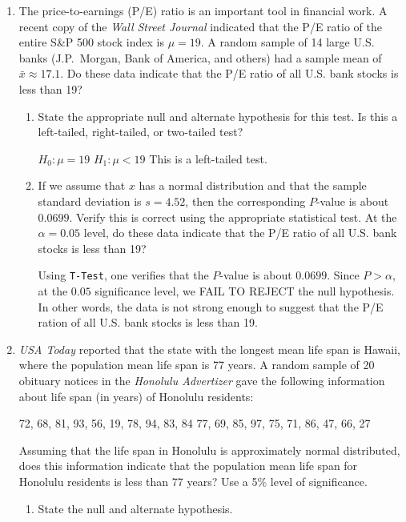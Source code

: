 \documentclass{article}
\newcommand{\answer}[1]{\color{white}#1}
\begin{document}
\begin{enumerate}
\begin{enumerate}
	\end{enumerate}

\vfill

\item The price-to-earnings (P/E) ratio is an important tool in financial work. A recent copy of the {\em Wall Street Journal} indicated that the P/E ratio of the entire S\&P 500 stock index is $\mu = 19$. A random sample of 14 large U.S. banks (J.P.\ Morgan, Bank of America, and others) had a sample mean of $\bar{x} \approx 17.1$. Do these data indicate that the P/E ratio of all U.S. bank stocks is less than 19?
	\begin{enumerate}
	\item State the appropriate null and alternate hypothesis for this test. Is this a left-tailed, right-tailed, or two-tailed test? 
	
	{\answer $H_0: \mu = 19$ 
	$H_1: \mu <19$ 
	This is a left-tailed test.} 
	
	\item If we assume that $x$ has a normal distribution and that the sample standard deviation is $s = 4.52$, then the corresponding $P$-value is about $0.0699$. Verify this is correct using the appropriate statistical test. At the $\alpha = 0.05$ level, do these data indicate that the P/E ratio of all U.S. bank stocks is less than 19? 
	
	{\answer Using \texttt{T-Test}, one verifies that the $P$-value is about $0.0699$. Since $P>\alpha$, at the $0.05$ significance level, we FAIL TO REJECT the null hypothesis. In other words, the data is not strong enough to suggest that the P/E ration of all U.S. bank stocks is less than 19.} 
	\vspace{1cm}
	
	\end{enumerate}

\vfill

\newpage

\item {\em USA Today} reported that the state with the longest mean life span is Hawaii, where the population mean life span is 77 years. A random sample of 20 obituary notices in the {\em Honolulu Advertizer} gave the following information about life span (in years) of Honolulu residents:
	\begin{center}
	72, 68, 81, 93, 56, 19, 78, 94, 83, 84  
	77, 69, 85, 97, 75, 71, 86, 47, 66, 27 
	\end{center}
Assuming that the life span in Honolulu is approximately normal distributed, does this information indicate that the population mean life span for Honolulu residents is less than 77 years? Use a 5\% level of significance.
	\begin{enumerate}
	\item State the null and alternate hypothesis.  
	

\end{enumerate}
\end{enumerate}
\end{document}
